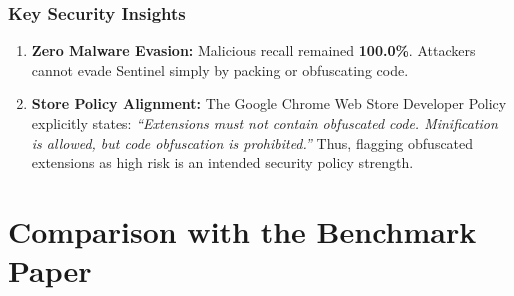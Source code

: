 \documentclass[conference]{IEEEtran}
\begin{document}
\begin{table}[!t]
\centering
\caption{Clean Baseline Test vs. Adversarial Obfuscation Stress Test}
\label{tab:obf}
\end{table}

\subsubsection{Key Security Insights}
\begin{enumerate}
    \item \textbf{Zero Malware Evasion:} Malicious recall remained \textbf{100.0\%}. Attackers cannot evade Sentinel simply by packing or obfuscating code.
    \item \textbf{Store Policy Alignment:} The Google Chrome Web Store Developer Policy explicitly states: \emph{``Extensions must not contain obfuscated code. Minification is allowed, but code obfuscation is prohibited.''} Thus, flagging obfuscated extensions as high risk is an intended security policy strength.
\end{enumerate}

\section{Comparison with the Benchmark Paper}
\end{document}
